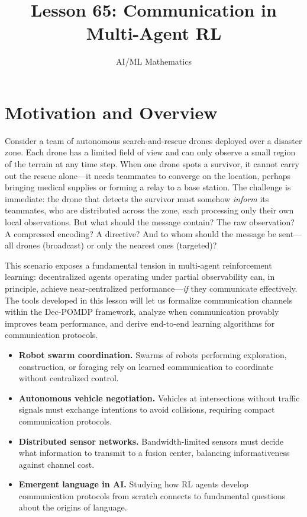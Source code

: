 \documentclass[11pt,a4paper]{article}
\title{Lesson 65: Communication in Multi-Agent RL}
\author{AI/ML Mathematics}
\date{}
\begin{document}
\maketitle
\tableofcontents
\newpage

\section{Motivation and Overview}
\label{sec:motivation}

Consider a team of autonomous search-and-rescue drones deployed
over a disaster zone.  Each drone has a limited field of view and
can only observe a small region of the terrain at any time step.
When one drone spots a survivor, it cannot carry out the rescue
alone---it needs teammates to converge on the location, perhaps
bringing medical supplies or forming a relay to a base station.
The challenge is immediate: the drone that detects the survivor
must somehow \emph{inform} its teammates, who are distributed
across the zone, each processing only their own local
observations.  But what should the message contain?  The raw
observation?  A compressed encoding?  A directive?  And to whom
should the message be sent---all drones (broadcast) or only the
nearest ones (targeted)?

This scenario exposes a fundamental tension in multi-agent
reinforcement learning: decentralized agents operating under
partial observability can, in principle, achieve near-centralized
performance---\emph{if} they communicate effectively.  The tools
developed in this lesson will let us formalize communication
channels within the Dec-POMDP framework, analyze when
communication provably improves team performance, and derive
end-to-end learning algorithms for communication protocols.

\begin{rlconnection}[title={Why Communication Matters for RL/ML}]
\begin{itemize}[nosep]
  \item \textbf{Robot swarm coordination.}  Swarms of robots
    performing exploration, construction, or foraging rely on
    learned communication to coordinate without centralized
    control.
  \item \textbf{Autonomous vehicle negotiation.}  Vehicles at
    intersections without traffic signals must exchange intentions
    to avoid collisions, requiring compact communication protocols.
  \item \textbf{Distributed sensor networks.}  Bandwidth-limited
    sensors must decide what information to transmit to a fusion
    center, balancing informativeness against channel cost.
  \item \textbf{Emergent language in AI.}  Studying how RL agents
    develop communication protocols from scratch connects to
    fundamental questions about the origins of language.
\end{itemize}
\end{rlconnection}
\end{document}
